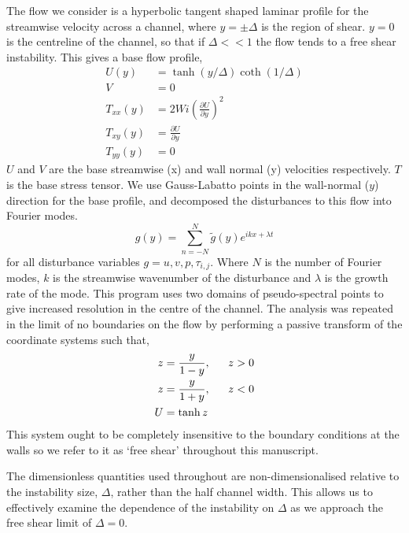 \documentclass{jfm}
\newcommand{\dy}[1]{\frac{\partial #1}{\partial y}}
\begin{document}
The flow we consider is a hyperbolic tangent shaped laminar profile for the
streamwise velocity across a channel, where $y = \pm \Delta$ is the region of
shear. $y=0$ is the centreline of the channel, so that if $\Delta << 1$ the
flow tends to a free shear instability. This gives a base flow profile, 
\begin{align} 
    U(y) &= \tanh \left( y/\Delta
    \right) \coth \left( 1/\Delta \right) \nonumber\\ V &= 0 \nonumber \\
    T_{xx}(y) &= 2 Wi \left( \dy{U} \right)^{2} \nonumber \\ T_{xy}(y) &=
    \dy{U} \nonumber \\ T_{yy}(y) &= 0 \label{eq:KH_laminar_profile}
\end{align}
$U$ and $V$ are the base streamwise (x) and wall normal (y) velocities
respectively. $T$ is the base stress tensor. We use Gauss-Labatto points in the
wall-normal ($y$) direction for the base profile, and decomposed the
disturbances to this flow into Fourier modes.  
\begin{equation} 
    g(y) = \sum\limits_{n=-N}^{N} \widetilde{g}(y) e^{ikx + \lambda t} 
\end{equation}
for all disturbance variables $g = u, v, p, \tau_{i,j}$. Where $N$ is the
number of Fourier modes, $k$ is the streamwise wavenumber of the disturbance
and $\lambda$ is the growth rate of the mode. This program uses two domains of
pseudo-spectral points to give increased resolution in the centre of the
channel. The analysis was repeated in the limit of no boundaries on the flow by
performing a passive transform of the coordinate systems such that, 
\begin{align} 
    z &= \frac{y}{1-y},\hphantom{aaa} z>0 \\
    z &= \frac{y}{1+y},\hphantom{aaa} z<0 \\ 
    U &= \tanh{z}
    \label{eq:KH_inf_profile} 
\end{align} 
This system ought to be completely insensitive to the boundary
conditions at the walls so we refer to it as `free shear' throughout this
manuscript. 

The dimensionless quantities used throughout are non-dimensionalised relative
to the instability size, $\Delta$, rather than the half channel width. This
allows us to effectively examine the dependence of the instability on $\Delta$
as we approach the free shear limit of $\Delta = 0$.
\end{document}
